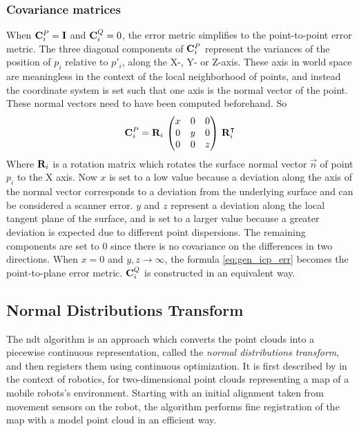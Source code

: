 \subsubsection{Covariance matrices}
When $\mathbf{C}^{P}_i = \mathbf{I}$ and  $\mathbf{C}^{Q}_i = 0$, the error metric simplifies to the point-to-point error metric. The three diagonal components of $\mathbf{C}^{P}_i$ represent the variances of the position of $p_i$ relative to $p'_i$, along the X-, Y- or Z-axis. These axis in world space are meaningless in the context of the local neighborhood of points, and instead the coordinate system is set such that one axis is the normal vector of the point. These normal vectors need to have been computed beforehand. So
\begin{equation}
\mathbf{C}^{P}_i = \mathbf{R}_{i} \, \left( \begin{matrix}
x & 0 & 0 \\
0 & y & 0 \\
0 & 0 & z
\end{matrix} \right) \, \mathbf{R}_{i}^\intercal
\end{equation}
Where $\mathbf{R}_i$ is a rotation matrix which rotates the surface normal vector $\vec{n}$ of point $p_i$ to the X axis. Now $x$ is set to a low value because a deviation along the axis of the normal vector corresponds to a deviation from the underlying surface and can be considered a scanner error. $y$ and $z$ represent a deviation along the local tangent plane of the surface, and is set to a larger value because a greater deviation is expected due to different point dispersions. The remaining components are set to $0$ since there is no covariance on the differences in two directions. When $x = 0$ and $y,z \rightarrow \infty$, the formula \ref{eq:gen_icp_err} becomes the point-to-plane error metric. $\mathbf{C}^{Q}_i$ is constructed in an equivalent way.


\subsection{Normal Distributions Transform}
The \gls{ndt} algorithm is an approach which converts the point clouds into a piecewise continuous representation, called the \emph{normal distributions transform}, and then registers them using continuous optimization. It is first described by \cite{Bibe2003} in the context of robotics, for two-dimensional point clouds representing a map of a mobile robots's environment. Starting with an initial alignment taken from movement sensors on the robot, the algorithm performs fine registration of the map with a model point cloud in an efficient way.

